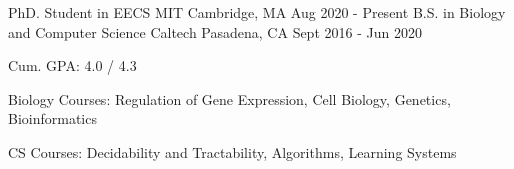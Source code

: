 

\begin{cventries}

  \cventry
    {PhD. Student in EECS} %
    {MIT} %
    {Cambridge, MA} %
    {Aug 2020 - Present} %
    {
    }
  \cventry
    {B.S. in Biology and Computer Science} %
    {Caltech} %
    {Pasadena, CA} %
    {Sept 2016 - Jun 2020} %
    {
      \begin{cvitems} %
        \item {Cum. GPA: 4.0 / 4.3}
        \item {Biology Courses: Regulation of Gene Expression, Cell Biology, Genetics, Bioinformatics}
        \item {CS Courses: Decidability and Tractability, Algorithms, Learning Systems}
      \end{cvitems}
    }

\end{cventries}
